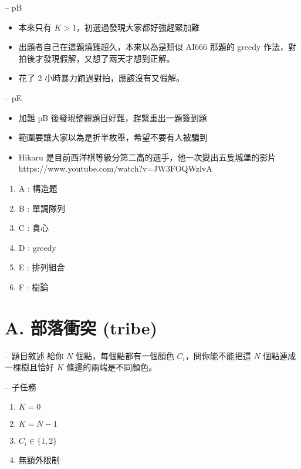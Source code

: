 \documentclass[hyperref,UTF8,notheorems,xcolor={dvipsnames}]{beamer}
\newcommand{\btitle}[1]{{\secname} -- #1}
\theoremstyle{definition}
\begin{document}
\begin{frame}[fragile]{\btitle{pB}}
	\begin{itemize}
		\item 本來只有 $K > 1$，初選過發現大家都好強趕緊加難
		\pause
		\item 出題者自己在這題燒雞超久，本來以為是類似 AI666 那題的 greedy 作法，對拍後才發現假解，又想了兩天才想到正解。
		\pause
		\item 花了 2 小時暴力跑過對拍，應該沒有又假解。
	\end{itemize}
\end{frame}

\begin{frame}[fragile]{\btitle{pE}}
	\begin{itemize}
		\item 加難 pB 後發現整體題目好難，趕緊重出一題簽到題
		\pause
		\item 範圍要讓大家以為是折半枚舉，希望不要有人被騙到
		\pause
		\item Hikaru 是目前西洋棋等級分第二高的選手，他一次變出五隻城堡的影片 https://www.youtube.com/watch?v=JW3FOQWzlvA
	\end{itemize}
\end{frame}


\begin{frame}[fragile]{\secname}
	\begin{enumerate}
		\item A : 構造題
		\item B : 單調隊列
		\item C : 貪心
		\item D : greedy
		\item E : 排列組合
		\item F : 樹論
	\end{enumerate}
\end{frame}

\section{A. 部落衝突 (tribe)}


\begin{frame}[fragile]{\btitle{題目敘述}}
	給你 $N$ 個點，每個點都有一個顏色 $C_i$，問你能不能把這 $N$ 個點連成一棵樹且恰好 $K$ 條邊的兩端是不同顏色。
\end{frame}

\begin{frame}[fragile]{\btitle{子任務}}
	\begin{enumerate}
		\item $K = 0$
		\item $K = N - 1$
		\item $C_i \in \{1, 2\}$
		\item 無額外限制
	\end{enumerate}
\end{frame}
\end{document}
